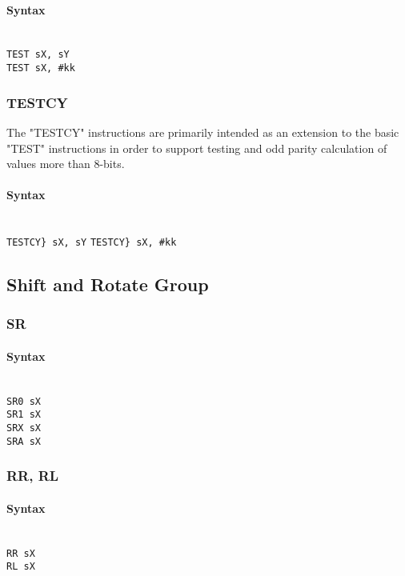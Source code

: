             \paragraph{Syntax}
                ~\\
                \verb'TEST sX, sY'\\
                \verb'TEST sX, #kk'

        \subsubsection{TESTCY}
            The "TESTCY" instructions are primarily intended as an extension to the basic "TEST" instructions in order to support testing and odd parity calculation of values more than 8-bits.

            \paragraph{Syntax}
                ~\\
                \verb'TESTCY} sX, sY'
                \verb'TESTCY} sX, #kk'

    \subsection{Shift and Rotate Group}
        \subsubsection{SR}
            \paragraph{Syntax}
                ~\\
                \verb'SR0 sX'\\
                \verb'SR1 sX'\\
                \verb'SRX sX'\\
                \verb'SRA sX'

        \subsubsection{RR, RL}
            \paragraph{Syntax}
                ~\\
                \verb'RR sX'\\
                \verb'RL sX'

